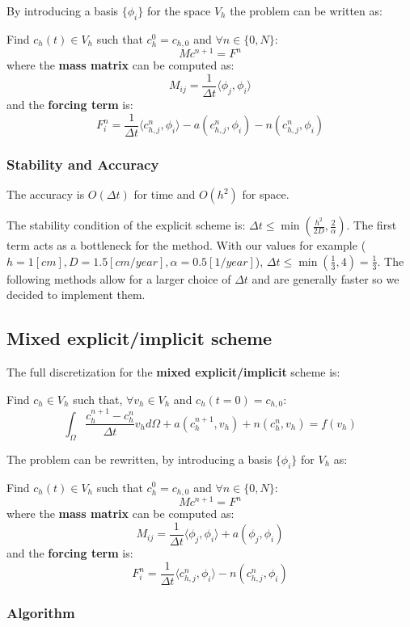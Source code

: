 \documentclass[12pt, letterpaper]{article}
\begin{document}
\noindent By introducing a basis $\{\phi_i\}$ for the space $V_h$ the problem can be written as:

\vspace{1em}
\noindent
Find $c_h(t)\in V_h$ such that $c_h^0=c_{h,0}$ and $\forall n\in\{0, N\}$:
$$Mc^{n+1}=F^n$$
where the \textbf{mass matrix} can be computed as:
$$M_{ij}=\frac1{\Delta t}\langle\phi_j,\phi_i\rangle$$
and the \textbf{forcing term} is:
$$F_i^n=\frac1{\Delta t}\langle c_{h,j}^n,\phi_i\rangle-a(c_{h,j}^n,\phi_i)-n(c_{h,j}^n,\phi_i)$$

\subsubsection{Stability and Accuracy}
The accuracy is $O(\Delta t)$ for time and $O(h^2)$ for space.

\noindent The stability condition of the explicit scheme is: $\Delta t\leq\min(\frac{h^2}{2D}, \frac2\alpha)$. The first term acts as a bottleneck for the method. With our values for example ($h=1[cm], D=1.5[cm/year], \alpha=0.5[1/year]$), $\Delta t\leq\min(\frac13, 4)=\frac13$. The following methods allow for a larger choice of $\Delta t$ and are generally faster so we decided to implement them.

\subsection{Mixed explicit/implicit scheme}
The full discretization for the \textbf{mixed explicit/implicit} scheme is:

\vspace{1em}
\noindent
Find $c_h\in V_h$ such that, $\forall v_h\in V_h$ and $c_h(t=0)=c_{h,0}$:
$$\int_\Omega\frac{c_h^{n+1}-c_h^n}{\Delta t}v_hd\Omega+a(c_h^{n+1},v_h)+n(c_h^n,v_h)=f(v_h)$$

\noindent The problem can be rewritten, by introducing a basis $\{\phi_i\}$ for $V_h$ as:

\vspace{1em}
\noindent
Find $c_h(t)\in V_h$ such that $c_h^0=c_{h,0}$ and $\forall n\in\{0, N\}$:
$$Mc^{n+1}=F^n$$
where the \textbf{mass matrix} can be computed as:
$$M_{ij}=\frac1{\Delta t}\langle\phi_j,\phi_i\rangle+a(\phi_j,\phi_i)$$
and the \textbf{forcing term} is:
$$F_i^n=\frac1{\Delta t}\langle c_{h,j}^n,\phi_i\rangle-n(c_{h,j}^n,\phi_i)$$

\subsubsection{Algorithm}
\end{document}
